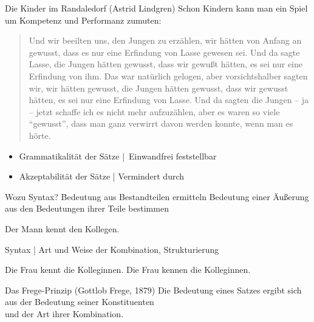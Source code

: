 
\begin{frame}
  {Die Kinder im Randaledorf (Astrid Lindgren)}
  \onslide<+->
  \onslide<+->
  Schon Kindern kann man ein Spiel um Kompetenz und Performanz zumuten:\\
  \Zeile
  \onslide<+->
  \begin{quote}
    Und wir beeilten uns, den Jungen zu erzählen, wir hätten von Anfang an gewusst, dass es nur eine
    Erfindung von Lasse gewesen sei. Und da sagte Lasse, die Jungen hätten gewusst, dass wir gewußt
    hätten, es sei nur eine Erfindung von ihm. Das war natürlich gelogen, aber vorsichtshalber sagten
    wir, wir hätten gewusst, die Jungen hätten gewusst, dass wir gewusst hätten, es sei nur eine Erfindung
    von Lasse. Und da sagten die Jungen -- ja -- jetzt schaffe ich es nicht mehr aufzuzählen, aber es
    waren so viele "`gewusst"', dass man ganz verwirrt davon werden konnte, wenn man es hörte.
  \end{quote}
  \Zeile
  \begin{itemize}[<+->]
    \item \alert{Grammatikalität} der Sätze | Einwandfrei feststellbar
    \item \alert{Akzeptabilität} der Sätze | Vermindert durch 
  \end{itemize}
\end{frame}

\begin{frame}
  {Wozu Syntax? Bedeutung aus Bestandteilen ermitteln}
  \onslide<+->
  \onslide<+->
  Bedeutung einer Äußerung aus den Bedeutungen ihrer Teile bestimmen\\
  \Viertelzeile
  \onslide<+->
  \begin{exe}
    \ex Der Mann kennt den Kollegen.
  \end{exe}
  \Halbzeile
  \onslide<+->
  \alert{Syntax} | Art und Weise der Kombination, Strukturierung\\
  \Viertelzeile
  \onslide<+->
  \begin{exe}
    \ex
    \begin{xlist}
      \ex Die Frau kennt die Kolleginnen.
      \ex Die Frau kennen die Kolleginnen.
    \end{xlist}
  \end{exe}
  \Halbzeile
  \onslide<+->
  \begin{block}
    {Das Frege-Prinzip (Gottlob Frege, 1879)}
    Die Bedeutung eines Satzes ergibt sich aus der Bedeutung seiner Konstituenten\\
    und der Art ihrer Kombination.
  \end{block}
\end{frame}
 

